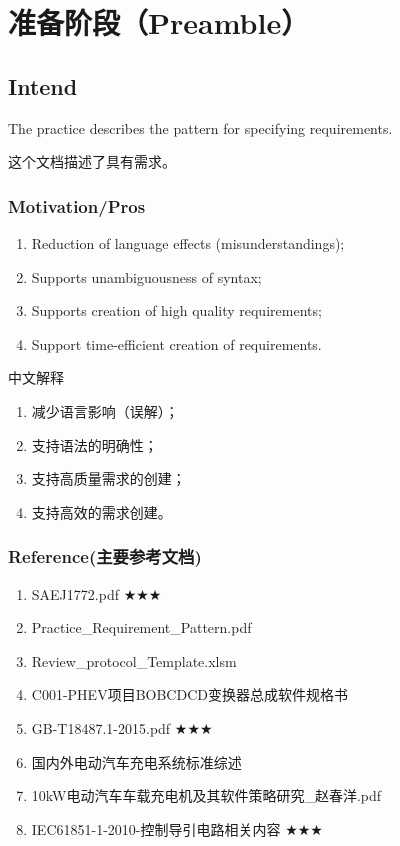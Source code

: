 \chapter{准备阶段（Preamble）}

\section{Intend}
The practice describes the pattern for specifying requirements.

这个文档描述了具有需求。

\subsection{Motivation/Pros}
\begin{enumerate}
	\item Reduction of language effects (misunderstandings);
	\item Supports unambiguousness of syntax;
	\item Supports creation of high quality requirements;
	\item Support time-efficient creation of requirements.
\end{enumerate}
中文解释
\begin{enumerate}[label=\textbullet]
	\item  减少语言影响（误解）；
	\item  支持语法的明确性；
	\item  支持高质量需求的创建；
	\item  支持高效的需求创建。
\end{enumerate}

\subsection{Reference(主要参考文档)}

	\begin{enumerate}[label=\alph*.]
		\item   SAEJ1772.pdf\cite{SAE} $\bigstar \bigstar \bigstar$
		\item   Practice\_Requirement\_Pattern.pdf\cite{Pattern}
		\item 	Review\_protocol\_Template.xlsm\cite{Review}
		\item 	C001-PHEV项目BOBCDCD变换器总成软件规格书\cite{PHEV}
		\item   GB-T18487.1-2015.pdf\cite{GB18487} $\bigstar \bigstar \bigstar$
		\item   国内外电动汽车充电系统标准综述\cite{zs}
		\item   10kW电动汽车车载充电机及其软件策略研究\_赵春洋.pdf\cite{zhao}
		\item 	IEC61851-1-2010-控制导引电路相关内容\cite{IEC61851} $\bigstar \bigstar \bigstar$
	\end{enumerate}
 
